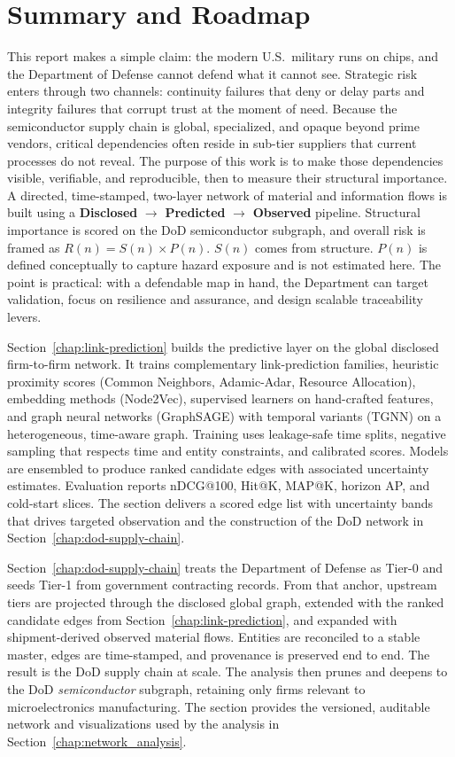 \section{Summary and Roadmap}
\label{sec:roadmap}

This report makes a simple claim: the modern U.S.\ military runs on chips, and the Department of Defense cannot defend what it cannot see. Strategic risk enters through two channels: continuity failures that deny or delay parts and integrity failures that corrupt trust at the moment of need. Because the semiconductor supply chain is global, specialized, and opaque beyond prime vendors, critical dependencies often reside in sub-tier suppliers that current processes do not reveal. The purpose of this work is to make those dependencies visible, verifiable, and reproducible, then to measure their structural importance. A directed, time-stamped, two-layer network of material and information flows is built using a \textbf{Disclosed} $\rightarrow$ \textbf{Predicted} $\rightarrow$ \textbf{Observed} pipeline. Structural importance is scored on the DoD semiconductor subgraph, and overall risk is framed as \(R(n)=S(n)\times P(n)\). \(S(n)\) comes from structure. \(P(n)\) is defined conceptually to capture hazard exposure and is not estimated here. The point is practical: with a defendable map in hand, the Department can target validation, focus on resilience and assurance, and design scalable traceability levers.

Section~\ref{chap:link-prediction} builds the predictive layer on the global disclosed firm-to-firm network. It trains complementary link-prediction families, heuristic proximity scores (Common Neighbors, Adamic-Adar, Resource Allocation), embedding methods (Node2Vec), supervised learners on hand-crafted features, and graph neural networks (GraphSAGE) with temporal variants (TGNN) on a heterogeneous, time-aware graph. Training uses leakage-safe time splits, negative sampling that respects time and entity constraints, and calibrated scores. Models are ensembled to produce ranked candidate edges with associated uncertainty estimates. Evaluation reports nDCG@100, Hit@K, MAP@K, horizon AP, and cold-start slices. The section delivers a scored edge list with uncertainty bands that drives targeted observation and the construction of the DoD network in Section~\ref{chap:dod-supply-chain}.

Section~\ref{chap:dod-supply-chain} treats the Department of Defense as Tier-0 and seeds Tier-1 from government contracting records. From that anchor, upstream tiers are projected through the disclosed global graph, extended with the ranked candidate edges from Section~\ref{chap:link-prediction}, and expanded with shipment-derived observed material flows. Entities are reconciled to a stable master, edges are time-stamped, and provenance is preserved end to end. The result is the DoD supply chain at scale. The analysis then prunes and deepens to the DoD \emph{semiconductor} subgraph, retaining only firms relevant to microelectronics manufacturing. The section provides the versioned, auditable network and visualizations used by the analysis in Section~\ref{chap:network_analysis}.

